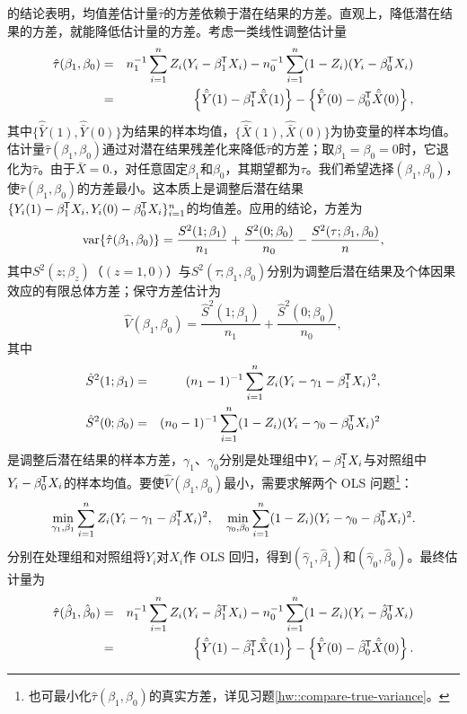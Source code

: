 \citet{Neyman:1923}的结论表明，均值差估计量$\hat{\tau}$的方差依赖于潜在结果的方差。直观上，降低潜在结果的方差，就能降低估计量的方差。考虑一类线性调整估计量
\begin{eqnarray} 
\hat{\tau}(\beta_1, \beta_0) &=& n_1^{-1} \sum_{i=1}^n Z_i(Y_i - \beta_1^{\mkern-1.5mu\mathsf{T}} X_i) - n_0^{-1} \sum_{i=1}^n (1-Z_i) (Y_i - \beta_0^{\mkern-1.5mu\mathsf{T}} X_i)  \label{eq::linear-adj-1}\\
&=& \left\{  \hat{\bar{Y}}(1) - \beta_1^{\mkern-1.5mu\mathsf{T}} \hat{\bar{X} }(1) \right\}  -  \left\{   \hat{\bar{Y}}(0) - \beta_0^{\mkern-1.5mu\mathsf{T}} \hat{\bar{X} }(0) \right\},
\label{eq::linear-adj-2}
\end{eqnarray}
其中$\{ \hat{\bar{Y}}(1), \hat{\bar{Y}}(0) \}$为结果的样本均值，$\{ \hat{\bar{X} }(1), \hat{\bar{X} }(0)\}$为协变量的样本均值。估计量$\hat{\tau}(\beta_1, \beta_0)$通过对潜在结果残差化来降低$\hat\tau$的方差；取$\beta_1 = \beta_0 = 0$时，它退化为$\hat\tau$。由于$\bar{X}  = 0.$，对任意固定$\beta_1$和$\beta_0$，其期望都为$\tau$。我们希望选择$(\beta_1, \beta_0)$，使$\hat{\tau}(\beta_1, \beta_0)$的方差最小。这本质上是调整后潜在结果$\{ Y_i(1) - \beta_1^{\mkern-1.5mu\mathsf{T}} X_i  , Y_i(0) - \beta_0^{\mkern-1.5mu\mathsf{T}}  X_i \}_{i=1}^n $的均值差。应用\citet{Neyman:1923}的结论，方差为
$$
\textup{var}\{ \hat{\tau}(\beta_1, \beta_0) \} = \frac{ {S}^2(1; \beta_1) }{ n_1 } + \frac{ {S}^2(0; \beta_0) }{ n_0 }
- \frac{  S^2(\tau; \beta_1, \beta_0)  }{ n },
$$
其中$ {S}^2(z; \beta_z)$（$(z=1,0)$）与$S^2(\tau; \beta_1, \beta_0)$分别为调整后潜在结果及个体因果效应的有限总体方差；保守方差估计为
$$
\hat{V}( \beta_1, \beta_0 ) = \frac{ \hat{S}^2(1; \beta_1) }{ n_1 } + \frac{ \hat{S}^2(0; \beta_0) }{ n_0 },
$$
其中
\begin{eqnarray*}
\hat{S}^2(1; \beta_1) &=& (n_1-1)^{-1} \sum_{i=1}^n Z_i  ( Y_i - \gamma_1 - \beta_1^{\mkern-1.5mu\mathsf{T}}  X_i )^2,\\ 
\hat{S}^2(0; \beta_0) &=& (n_0-1)^{-1} \sum_{i=1}^n (1-Z_i)  ( Y_i - \gamma_0 - \beta_0^{\mkern-1.5mu\mathsf{T}}  X_i )^2
\end{eqnarray*}
是调整后潜在结果的样本方差，$\gamma_1$、$\gamma_0$分别是处理组中$Y_i - \beta_1^{\mkern-1.5mu\mathsf{T}}  X_i$与对照组中$Y_i   - \beta_0^{\mkern-1.5mu\mathsf{T}}  X_i $的样本均值。要使$\hat{V}( \beta_1, \beta_0 )$最小，需要求解两个 OLS 问题\footnote{也可最小化$\hat{\tau}(\beta_1, \beta_0) $的真实方差，详见习题\ref{hw::compare-true-variance}。}：
$$
\min_{\gamma_1 , \beta_1 }
\sum_{i=1}^n Z_i  ( Y_i - \gamma_1 - \beta_1^{\mkern-1.5mu\mathsf{T}}  X_i )^2,\quad
\min_{\gamma_0 , \beta_0 }
\sum_{i=1}^n (1-Z_i)  ( Y_i - \gamma_0 - \beta_0^{\mkern-1.5mu\mathsf{T}}  X_i  )^2.
$$
分别在处理组和对照组将$Y_i$对$X_i$作 OLS 回归，得到$( \hat{\gamma}_1, \hat{\beta}_1 )$和$( \hat{\gamma}_0, \hat{\beta}_0 )$。最终估计量为
\begin{eqnarray*}
 \hat{\tau}( \hat{\beta}_1, \hat{\beta}_0) &=& n_1^{-1} \sum_{i=1}^n Z_i(Y_i - \hat{\beta}_1^{\mkern-1.5mu\mathsf{T}}  X_i) 
- n_0^{-1} \sum_{i=1}^n (1-Z_i)  (Y_i - \hat{\beta}_0^{\mkern-1.5mu\mathsf{T}}  X_i) \\
&=&\left\{  \hat{\bar{Y}}(1) - \hat \beta_1^{\mkern-1.5mu\mathsf{T}} \hat{\bar{X} }(1) \right\}  
-  \left\{   \hat{\bar{Y}}(0) - \hat \beta_0^{\mkern-1.5mu\mathsf{T}} \hat{\bar{X} }(0) \right\} . 
\end{eqnarray*}
